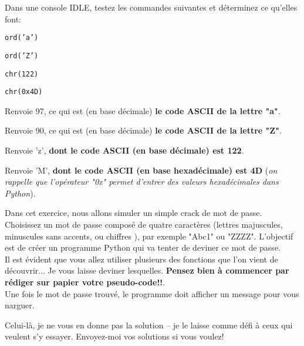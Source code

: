 \documentclass[12pt]{article}
\begin{document}
	\begin{MonExo}
		Dans une console IDLE, testez les commandes suivantes et déterminez ce qu'elles font:
		\begin{alphenum}
			\item \texttt{ord('a')}
			\item \texttt{ord('Z')}
			\item \texttt{chr(122)}
			\item \texttt{chr(0x4D)}
		\end{alphenum}
	\end{MonExo}
	\begin{MaReponse}
		\begin{alphenum}
			\item Renvoie 97, ce qui est (en base décimale) \textbf{le code ASCII de la lettre "a"}.
			\item Renvoie 90, ce qui est (en base décimale) \textbf{le code ASCII de la lettre "Z"}.
			\item Renvoie 'z', \textbf{dont le code ASCII (en base décimale) est 122}.
			\item Renvoie 'M', \textbf{dont le code ASCII (en base hexadécimale) est 4D} (\textit{on rappelle que l'opérateur "0x" permet d'entrer des valeurs hexadécimales dans Python}).
		\end{alphenum}
	\end{MaReponse}
	
	\begin{MonExo}
		Dans cet exercice, nous allons simuler un simple crack de mot de passe. Choisissez un mot de passe composé de quatre caractères (lettres majuscules, minuscules sans accents, ou chiffres ), par exemple "Abc1" ou "ZZZZ". L'objectif est de créer un programme Python qui va tenter de deviner ce mot de passe.		
		\\
		
		Il est évident que vous allez utiliser plusieurs des fonctions que l'on vient de découvrir... Je vous laisse deviner lesquelles. \textbf{Pensez bien à commencer par rédiger sur papier votre pseudo-code!!}.
		\\
		
		Une fois le mot de passe trouvé, le programme doit afficher un message pour vous narguer.
	\end{MonExo}
	\begin{MaReponse}
		Celui-là, je ne vous en donne pas la solution -- je le laisse comme défi à ceux qui veulent s'y essayer. Envoyez-moi vos solutions si vous voulez!
	\end{MaReponse}
\end{document}
